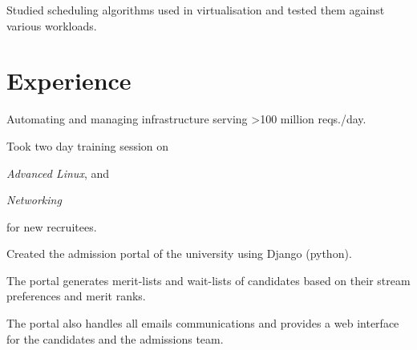 \documentclass[]{deedy}
\begin{document}
\begin{minipage}[t]{0.66\textwidth}
\begin{tightemize}
\item Studied scheduling algorithms used in virtualisation and tested them against various workloads.
\end{tightemize}

\section{Experience}
\begin{tightemize}
\item Automating and managing infrastructure serving >100 million reqs./day.
\item Took two day training session on 
\begin{enumerate*}[label=(\roman*)]
  \item \textit{Advanced Linux}, and
  \item \textit{Networking}
\end{enumerate*}
 for new recruitees.
\end{tightemize}
\sectionsep

\begin{tightemize}
\item Created the admission portal of the university using Django (python).
\item The portal generates merit-lists and wait-lists of candidates based on their stream preferences and merit ranks. 
\item The portal also handles all emails communications and provides a web interface for the candidates and the admissions team.
\end{tightemize}
\sectionsep



\end{minipage}
\end{document}
